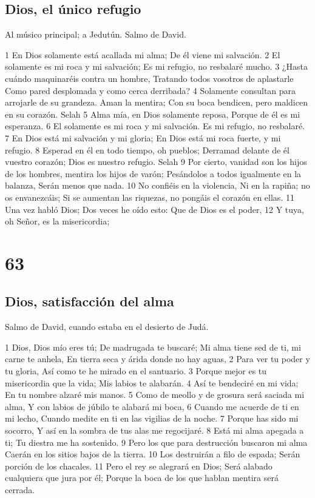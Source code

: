 \section*{Dios, el único refugio}

Al músico principal; a Jedutún. Salmo de David.

1 En Dios solamente está acallada mi alma;
De él viene mi salvación.
2 El solamente es mi roca y mi salvación;
Es mi refugio, no resbalaré mucho.
3 ¿Hasta cuándo maquinaréis contra un hombre,
Tratando todos vosotros de aplastarle
Como pared desplomada y como cerca derribada?
4 Solamente consultan para arrojarle de su grandeza.
Aman la mentira;
Con su boca bendicen, pero maldicen en su corazón. Selah
5 Alma mía, en Dios solamente reposa,
Porque de él es mi esperanza.
6 El solamente es mi roca y mi salvación.
Es mi refugio, no resbalaré.
7 En Dios está mi salvación y mi gloria;
En Dios está mi roca fuerte, y mi refugio.
8 Esperad en él en todo tiempo, oh pueblos;
Derramad delante de él vuestro corazón;
Dios es nuestro refugio. Selah
9 Por cierto, vanidad son los hijos de los hombres, mentira los hijos de varón;
Pesándolos a todos igualmente en la balanza,
Serán menos que nada.
10 No confiéis en la violencia,
Ni en la rapiña; no os envanezcáis;
Si se aumentan las riquezas, no pongáis el corazón en ellas.
11 Una vez habló Dios;
Dos veces he oído esto:
Que de Dios es el poder,
12 Y tuya, oh Señor, es la misericordia; 
 

\chapter{63}

\section*{Dios, satisfacción del alma}

Salmo de David, cuando estaba en el desierto de Judá.

1 Dios, Dios mío eres tú;
De madrugada te buscaré;
Mi alma tiene sed de ti, mi carne te anhela,
En tierra seca y árida donde no hay aguas,
2 Para ver tu poder y tu gloria,
Así como te he mirado en el santuario.
3 Porque mejor es tu misericordia que la vida;
Mis labios te alabarán.
4 Así te bendeciré en mi vida;
En tu nombre alzaré mis manos.
5 Como de meollo y de grosura será saciada mi alma,
Y con labios de júbilo te alabará mi boca,
6 Cuando me acuerde de ti en mi lecho,
Cuando medite en ti en las vigilias de la noche.
7 Porque has sido mi socorro,
Y así en la sombra de tus alas me regocijaré.
8 Está mi alma apegada a ti;
Tu diestra me ha sostenido.
9 Pero los que para destrucción buscaron mi alma
Caerán en los sitios bajos de la tierra.
10 Los destruirán a filo de espada;
Serán porción de los chacales.
11 Pero el rey se alegrará en Dios;
Será alabado cualquiera que jura por él;
Porque la boca de los que hablan mentira será cerrada.

